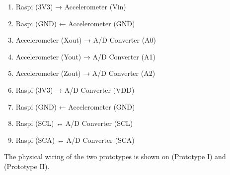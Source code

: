 \begin{multicols}{2}
    \begin{enumerate}
        \item Raspi (3V3) → Accelerometer (Vin)
        \item Raspi (GND) ← Accelerometer (GND)
        \item Accelerometer (Xout) → A/D Converter (A0)
        \item Accelerometer (Yout) → A/D Converter (A1)
        \item Accelerometer (Zout) → A/D Converter (A2)
        \item Raspi (3V3) → A/D Converter (VDD)
        \item Raspi (GND) ← Accelerometer (GND)
        \item Raspi (SCL) ↔ A/D Converter (SCL)
        \item Raspi (SCA) ↔ A/D Converter (SCA)
    \end{enumerate}
\end{multicols}

The physical wiring of the two prototypes is shown on  (Prototype I) and  (Prototype II).

